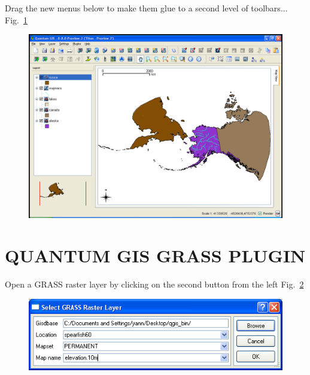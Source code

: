 Drag the new menus below to make them glue to a second level of
toolbars... Fig.~\ref{fig:qgis013}

\begin{figure}[htbp]
   \centering
   \includegraphics[scale=0.2]{qgis013.png}
   \caption{}
   \label{fig:qgis013}
\end{figure}

\section{QUANTUM GIS GRASS PLUGIN}

Open a GRASS raster layer by clicking on the second button from the
left Fig.~\ref{fig:qgis014}

\begin{figure}[htbp]
   \centering
   \includegraphics[scale=0.45]{qgis014.png}
   \caption{}
   \label{fig:qgis014}
\end{figure}

